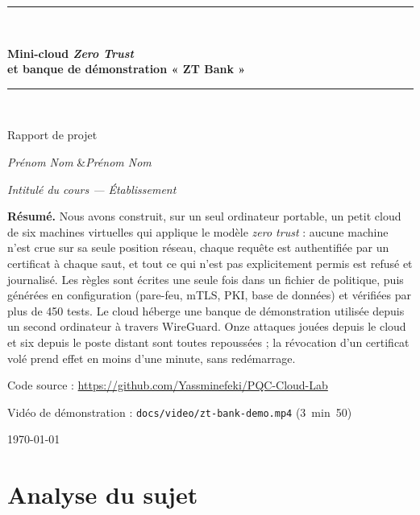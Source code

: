 \documentclass[11pt,a4paper]{article}
\newcommand{\titre}{Mini-cloud \emph{Zero Trust}\\[2pt]et banque de démonstration « ZT Bank »}
\newcommand{\auteurs}{\textit{Prénom Nom} \quad\&\quad \textit{Prénom Nom}}   %
\newcommand{\cours}{\textit{Intitulé du cours — Établissement}}               %
\newcommand{\depot}{\url{https://github.com/Yassminefeki/PQC-Cloud-Lab}}
\begin{document}
\sloppy

\begin{titlepage}
  \centering
  \vspace*{2.5cm}
  {\color{zt}\rule{\linewidth}{1.2pt}}\\[14pt]
  {\Huge\bfseries\color{zt}\titre\par}
  \vspace{10pt}
  {\color{zt}\rule{\linewidth}{1.2pt}}\\[24pt]
  {\Large Rapport de projet\par}
  \vspace{2.2cm}
  {\large \auteurs\par}
  \vspace{8pt}
  {\cours\par}
  \vspace{2.2cm}
  \begin{minipage}{0.82\linewidth}
  \small
  \textbf{Résumé.} Nous avons construit, sur un seul ordinateur portable, un petit cloud de six
  machines virtuelles qui applique le modèle \emph{zero trust} : aucune machine n'est crue sur sa
  seule position réseau, chaque requête est authentifiée par un certificat à chaque saut, et tout
  ce qui n'est pas explicitement permis est refusé et journalisé. Les règles sont écrites une seule
  fois dans un fichier de politique, puis générées en configuration (pare-feu, mTLS, PKI, base de
  données) et vérifiées par plus de 450 tests. Le cloud héberge une banque de démonstration utilisée
  depuis un second ordinateur à travers WireGuard. Onze attaques jouées depuis le cloud et six depuis le
  poste distant sont toutes repoussées ; la révocation d'un certificat volé prend effet en moins d'une
  minute, sans redémarrage.
  \end{minipage}
  \vfill
  {\small Code source : \depot\par}
  \vspace{3pt}
  {\small Vidéo de démonstration : \texttt{docs/video/zt-bank-demo.mp4} (3~min~50)\par}
  \vspace{6pt}
  {\small \today\par}
\end{titlepage}

\tableofcontents
\newpage

\section{Analyse du sujet}
\end{document}
